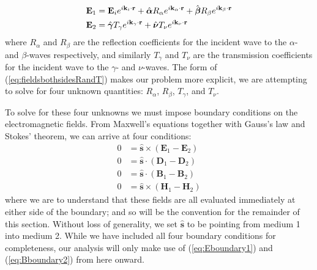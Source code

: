 \documentclass[11pt, reqno]{book}%
\newcounter{ct}
\newcommand{\mbf}{\mathbf}
\newcommand{\mbfg}[1]{\mbf{\mbox{\boldmath$#1$}}}
\newcommand{\mbfgh}[1]{\hat{\mbfg{#1}}}
\newcommand{\mbfh}[1]{\hat{\mbf{#1}}}
\begin{document}
\begin{subequations}
\begin{align}
\mbf{E}_1 &= \mbf{E}_{i} e^{i \mbf{k}_i \cdot \mbf{r}} + \mbfgh{\alpha} R_{\alpha} e^{i\mbf{k}_\alpha \cdot \mbf{r}} +\mbfgh{\beta} R_\beta e^{i\mbf{k}_\beta \cdot \mbf{r}} \\
\mbf{E}_2 & = \mbfgh{\gamma} T_\gamma e^{i\mbf{k}_\gamma\cdot \mbf{r}} + \mbfgh{\nu} T_\nu e^{i\mbf{k}_\nu \cdot \mbf{r}}
\end{align}
\label{eq:fieldsbothsidesRandT}%
\end{subequations}
\noindent where $R_\alpha$ and $R_\beta$ are the reflection coefficients for the incident wave to the $\alpha$- and $\beta$-waves respectively, and similarly $T_\gamma$ and $T_\nu$ are the transmission coefficients for the incident wave to the $\gamma$- and $\nu$-waves. The form of (\ref{eq:fieldsbothsidesRandT}) makes our problem more explicit, we are attempting to solve for four unknown quantities: $R_\alpha$, $R_\beta$, $T_\gamma$, and $T_\nu$.

To solve for these four unknowns we must impose boundary conditions on the electromagnetic fields. From Maxwell's equations together with Gauss's law and Stokes' theorem, we can arrive at four conditions:
\begin{subequations}
\begin{align}
0&=\mbfh{s}\times \left(\mbf{E}_1-\mbf{E}_2\right)  \label{eq:Eboundary1} \\
0&= \mbfh{s}\cdot\left(\mbf{D}_1-\mbf{D}_2\right) \label{eq:Eboundary2} \\
0&=\mbfh{s}\cdot\left(\mbf{B}_1-\mbf{B}_2\right) \label{eq:Bboundary1} \\
0&=\mbfh{s}\times\left( \mbf{H}_1 - \mbf{H}_2 \right) \label{eq:Bboundary2}
\end{align}
\label{eq:MAXboundary}%
\end{subequations}
\noindent where we are to understand that these fields are all evaluated immediately at either side of the boundary; and so will be the convention for the remainder of this section. Without loss of generality, we set $\mbfh{s}$ to be pointing from medium 1 into medium 2. While we have included all four boundary conditions for completeness, our analysis will only make use of (\ref{eq:Eboundary1}) and (\ref{eq:Bboundary2}) from here onward. 
\end{document}
